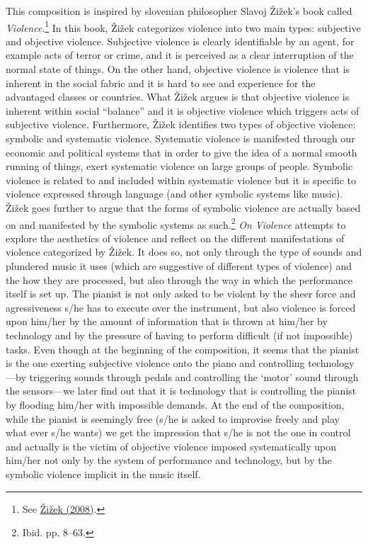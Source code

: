 This composition is inspired by slovenian philosopher Slavoj \v{Z}i\v{z}ek's book called \emph{Violence}.\footnote{See \hyperlink{zizekviolence}{\v{Z}i\v{z}ek (2008)}.}
In this book, \v{Z}i\v{z}ek categorizes violence into two main types: subjective and objective violence. Subjective violence is clearly identifiable by an agent, for example acts of terror or crime, and it is perceived as a clear interruption of the normal state of things. On the other hand, objective violence is violence that is inherent in the social fabric and it is hard to see and experience for the advantaged classes or countries. What \v{Z}i\v{z}ek argues is that objective violence is inherent within social ``balance'' and it is objective violence which triggers acts of subjective violence. Furthermore, \v{Z}i\v{z}ek identifies two types of objective violence: symbolic and systematic violence. Systematic violence is manifested through our economic and political systems that in order to give the idea of a normal smooth running of things, exert systematic violence on large groups of people. Symbolic violence is related to and included within systematic violence but it is specific to violence expressed through language (and other symbolic systems like music). \v{Z}i\v{z}ek goes further to argue that the forms of symbolic violence are actually based on and manifested by the symbolic systems as such.\footnote{Ibid. pp. 8--63.} \emph{On Violence} attempts to explore the aesthetics of violence and reflect on the different manifestations of violence categorized by \v{Z}i\v{z}ek. It does so, not only through the type of sounds and plundered music it uses (which are suggestive of different types of violence) and the how they are processed, but also through the way in which the performance itself is set up. The pianist is not only asked to be violent by the sheer force and agressiveness s/he has to execute over the instrument, but also violence is forced upon him/her by the amount of information that is thrown at him/her by technology and by the pressure of having to perform difficult (if not impossible) tasks. Even though at the beginning of the composition, it seems that the pianist is the one exerting subjective violence onto the piano and controlling technology---by triggering sounds through pedals and controlling the `motor' sound through the sensors---we later find out that it is technology that is controlling the pianist by flooding him/her with impossible demands. At the end of the composition, while the pianist is seemingly free (s/he is asked to improvise freely and play what ever s/he wants) we get the impression that s/he is not the one in control and actually is the victim of objective violence imposed systematically upon him/her not only by the system of performance and technology, but by the symbolic violence implicit in the music itself.

